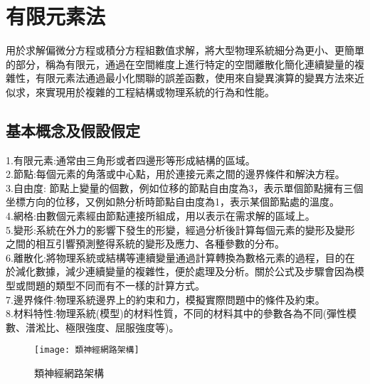 \chapter{有限元素法}
用於求解偏微分方程或積分方程組數值求解，將大型物理系統細分為更小、更簡單的部分，稱為有限元，通過在空間維度上進行特定的空間離散化簡化連續變量的複雜性，有限元素法通過最小化關聯的誤差函數，使用來自變異演算的變異方法來近似求，來實現用於複雜的工程結構或物理系統的行為和性能。\\

\section{基本概念及假設假定}

1.有限元素:通常由三角形或者四邊形等形成結構的區域。\\

2.節點:每個元素的角落或中心點，用於連接元素之間的邊界條件和解決方程。\\

3.自由度: 節點上變量的個數，例如位移的節點自由度為3，表示單個節點擁有三個坐標方向的位移，又例如熱分析時節點自由度為1，表示某個節點處的溫度。\\

4.網格:由數個元素經由節點連接所組成，用以表示在需求解的區域上。\\

5.變形:系統在外力的影響下發生的形變，經過分析後計算每個元素的變形及變形之間的相互引響預測整得系統的變形及應力、各種參數的分布。\\

6.離散化:將物理系統或結構等連續變量通過計算轉換為數格元素的過程，目的在於減化數據，減少連續變量的複雜性，便於處理及分析。關於公式及步驟會因為模型或問題的類型不同而有不一樣的計算方式。\\

7.邊界條件:物理系統邊界上的約束和力，模擬實際問題中的條件及約束。\\

8.材料特性:物理系統(模型)的材料性質，不同的材料其中的參數各為不同(彈性模數、潽淞比、極限強度、屈服強度等)。\\

\begin{figure}[hbt!]
\begin{center}
\texttt{[image: 類神經網路架構]}
\caption{\Large 類神經網路架構}\label{類神經網路架構}
\end{center}
\end{figure}
\newpage

